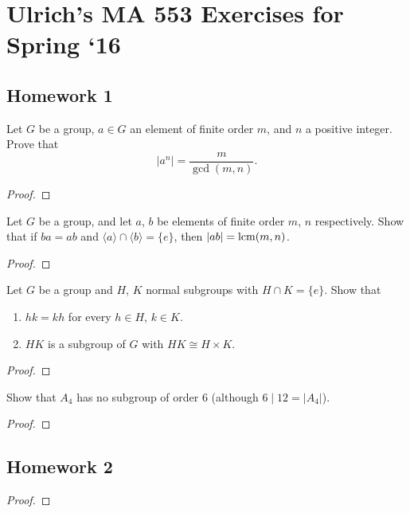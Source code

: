 \chapter{Ulrich's MA 553 Exercises for Spring `16}
\section{Homework 1}
\begin{exercise}
Let $G$ be a group, $a\in G$ an element of finite order $m$, and $n$ a
positive integer. Prove that
\[
|a^n|=\frac{m}{\gcd(m,n)}.
\]
\end{exercise}
\begin{proof}
\end{proof}

\begin{exercise}
Let $G$ be a group, and let $a$, $b$ be elements of finite order $m$, $n$
respectively. Show that if $ba=ab$ and $\langle a\rangle\cap\langle
b\rangle=\{e\}$, then $|ab|=\operatorname{lcm}(m,n)$.
\end{exercise}
\begin{proof}
\end{proof}

\begin{exercise}
Let $G$ be a group and $H$, $K$ normal subgroups with $H\cap K=\{e\}$. Show
that
\begin{enumerate}[label=(\alph*)]
\item $hk=kh$ for every $h\in H$, $k\in K$.
\item $HK$ is a subgroup of $G$ with $HK\cong H\times K$.
\end{enumerate}
\end{exercise}
\begin{proof}
\end{proof}

\begin{exercise}
Show that $A_4$ has no subgroup of order $6$ (although $6\mid 12=|A_4|$).
\end{exercise}
\begin{proof}
\end{proof}

\section{Homework 2}
\begin{exercise}
\end{exercise}
\begin{proof}
\end{proof}

